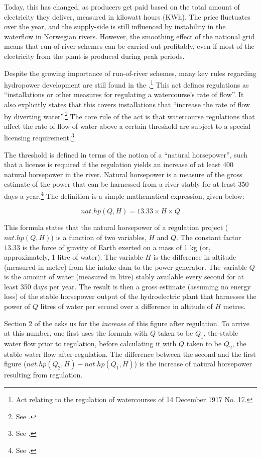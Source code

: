 Today, this has changed, as producers get paid based on the total amount of electricity they deliver,  measured in kilowatt hours (KWh). The price fluctuates over the year, and the supply-side is still influenced by instability in the waterflow in Norwegian rivers. However, the smoothing effect of the national grid means that run-of-river schemes can be carried out profitably, even if most of the electricity from the plant is produced during peak periods.

Despite the growing importance of run-of-river schemes, many key rules regarding hydropower development are still found in the \cite{wra17}.\footnote{Act relating to the regulation of watercourses of 14 December 1917 No. 17.} This act defines regulations as ``installations or other measures for regulating a watercourse's rate of flow''. It also explicitly states that this covers installations that ``increase the rate of flow by diverting water''.\footnote{See \cite[1]{wra17}.} The core rule of the act is that watercourse regulations that affect the rate of flow of water above a certain threshold are subject to a special licensing requirement.\footnote{See \cite[2]{wra17}.}

The threshold is defined in terms of the notion of a ``natural horsepower'', such that a license is required if the regulation yields an increase of at least 400 natural horsepower in the river. Natural horsepower is a measure of the gross estimate of the power that can be harnessed from a river stably for at least 350 days a year.\footnote{See \cite[2]{wra17}.} The definition is a simple mathematical expression, given below:

$$
nat.hp(Q,H) = 13.33 \times H \times Q
$$

This formula states that the natural horsepower of a regulation project ($nat.hp(Q,H)$) is a function of two variables, $H$ and $Q$. The constant factor $13.33$ is the force of gravity of Earth exerted on a mass of 1 kg (or, approximately, 1 litre of water). The variable $H$ is the difference in altitude (measured in metre) from the intake dam to the power generator. The variable $Q$ is the amount of water (measured in litre) stably available every second for at least 350 days per year. The result is then a gross estimate (assuming no energy loss) of the stable horsepower output of the hydroelectric plant that harnesses the power of $Q$ litres of water per second over a difference in altitude of $H$ metres. 

Section 2 of the \cite{wra17} asks us for the {\it increase} of this figure after regulation. To arrive at this number, one first uses the formula with $Q$ taken to be $Q_1$, the stable water flow prior to regulation, before calculating it with $Q$ taken to be $Q_2$, the stable water flow after regulation. The difference between the second and the first figure ($nat.hp(Q_2,H) - nat.hp(Q_1,H)$) is the increase of natural horsepower resulting from regulation.

